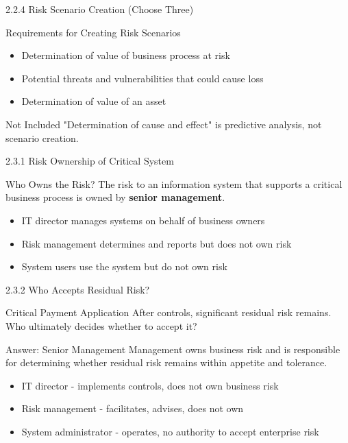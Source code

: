 \documentclass{beamer}
\begin{document}
	\begin{frame}{2.2.4 Risk Scenario Creation (Choose Three)}
		\begin{block}{Requirements for Creating Risk Scenarios}
			\begin{itemize}
				\item Determination of value of business process at risk
				\item Potential threats and vulnerabilities that could cause loss
				\item Determination of value of an asset
			\end{itemize}
		\end{block}
		\begin{alertblock}{Not Included}
			"Determination of cause and effect" is predictive analysis, not scenario creation.
		\end{alertblock}
	\end{frame}
	
	\begin{frame}{2.3.1 Risk Ownership of Critical System}
		\begin{block}{Who Owns the Risk?}
			The risk to an information system that supports a critical business process is owned by \textbf{senior management}.
		\end{block}
		\begin{itemize}
			\item IT director manages systems on behalf of business owners
			\item Risk management determines and reports but does not own risk
			\item System users use the system but do not own risk
		\end{itemize}
	\end{frame}
	
	\begin{frame}{2.3.2 Who Accepts Residual Risk?}
		\begin{block}{Critical Payment Application}
			After controls, significant residual risk remains. Who ultimately decides whether to accept it?
		\end{block}
		\begin{exampleblock}{Answer: Senior Management}
			Management owns business risk and is responsible for determining whether residual risk remains within appetite and tolerance.
		\end{exampleblock}
		\begin{itemize}
			\item IT director - implements controls, does not own business risk
			\item Risk management - facilitates, advises, does not own
			\item System administrator - operates, no authority to accept enterprise risk
		\end{itemize}
	\end{frame}
	
\end{document}
